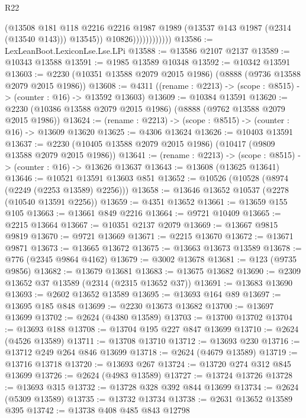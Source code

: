 \begin{lexlean}{R22}
\begin{coremodule}
                              (@13508
                                @181
                                @118
                                @2216
                                @2216
                                @1987
                                @1989
                                (@13537 @143 @1987 (@2314 (@13540 @143)))
                                @13545))
                            @10826))))))))))))
@13586 := LexLeanBoot.LexiconLse.Lse.LPi
@13588 := @13586 @2107 @2137
@13589 := @10343 @13588
@13591 := @1985 @13589 @10348
@13592 := @10342 @13591
@13603 := @2230 (@10351 @13588 @2079 @2015 @1986) (@8888 (@9736 @13588 @2079 @2015 @1986))
@13608 := @4311 ((rename : @2213) -> (scope : @8515) -> (counter : @16) -> @13592 @13603)
@13609 := @10384 @13591
@13620 := @2230 (@10386 @13588 @2079 @2015 @1986) (@8888 (@9762 @13588 @2079 @2015 @1986))
@13624 := (rename : @2213) -> (scope : @8515) -> (counter : @16) -> @13609 @13620
@13625 := @4306 @13624
@13626 := @10403 @13591
@13637 := @2230 (@10405 @13588 @2079 @2015 @1986) (@10417 (@9809 @13588 @2079 @2015 @1986))
@13641 := (rename : @2213) -> (scope : @8515) -> (counter : @16) -> @13626 @13637
@13643 := @13608 (@13625 @13641)
@13646 := @10521 @13591 @13603 @851
@13652 := @10526 (@10528 (@8974 (@2249 (@2253 @13589) @2256)))
@13658 := @13646 @13652 @10537 (@2278 (@10540 @13591 @2256))
@13659 := @4351 @13652
@13661 := @13659 @155 @105
@13663 := @13661 @849 @2216
@13664 := @9721 @10409
@13665 := @2215 @13664
@13667 := @10351 @2137 @2079
@13669 := @13667 @9815 @9819
@13670 := @9721 @13669
@13671 := @2215 @13670
@13672 := @13671 @9871
@13673 := @13665 @13672
@13675 := @13663 @13673 @13589
@13678 := @776 (@2345 @9864 @4162)
@13679 := @3002 @13678
@13681 := @123 (@9735 @9856)
@13682 := @13679 @13681
@13683 := @13675 @13682
@13690 := @2309 @13652 @37 @13589 (@2314 (@2315 @13652 @37))
@13691 := @13683 @13690
@13693 := @2602 @13652 @13589
@13695 := @13693 @164 @89
@13697 := @13695 @185 @848
@13699 := @2230 @13673 @13682
@13700 := @13697 @13699
@13702 := @2624 (@4380 @13589)
@13703 := @13700 @13702
@13704 := @13693 @188
@13708 := @13704 @195 @227 @847 @13699
@13710 := @2624 (@4526 @13589)
@13711 := @13708 @13710
@13712 := @13693 @230
@13716 := @13712 @249 @264 @846 @13699
@13718 := @2624 (@4679 @13589)
@13719 := @13716 @13718
@13720 := @13693 @267
@13724 := @13720 @274 @312 @845 @13699
@13726 := @2624 (@4983 @13589)
@13727 := @13724 @13726
@13728 := @13693 @315
@13732 := @13728 @328 @392 @844 @13699
@13734 := @2624 (@5309 @13589)
@13735 := @13732 @13734
@13738 := @2631 @13652 @13589 @395
@13742 := @13738 @408 @485 @843 @12798

\end{coremodule}
\end{lexlean}
